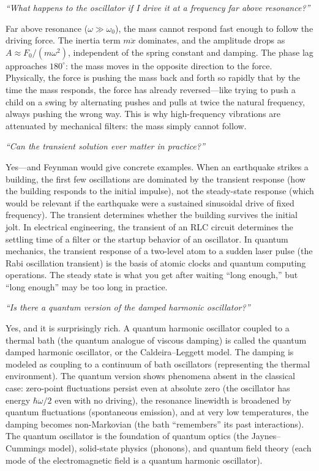 \textit{``What happens to the oscillator if I drive it at a frequency far above resonance?''}

Far above resonance ($\omega \gg \omega_0$), the mass cannot respond fast enough to follow the driving force. The inertia term $m\ddot{x}$ dominates, and the amplitude drops as $A \approx F_0/(m\omega^2)$, independent of the spring constant and damping. The phase lag approaches $180^\circ$: the mass moves in the opposite direction to the force. Physically, the force is pushing the mass back and forth so rapidly that by the time the mass responds, the force has already reversed---like trying to push a child on a swing by alternating pushes and pulls at twice the natural frequency, always pushing the wrong way. This is why high-frequency vibrations are attenuated by mechanical filters: the mass simply cannot follow.

\textit{``Can the transient solution ever matter in practice?''}

Yes---and Feynman would give concrete examples. When an earthquake strikes a building, the first few oscillations are dominated by the transient response (how the building responds to the initial impulse), not the steady-state response (which would be relevant if the earthquake were a sustained sinusoidal drive of fixed frequency). The transient determines whether the building survives the initial jolt. In electrical engineering, the transient of an RLC circuit determines the settling time of a filter or the startup behavior of an oscillator. In quantum mechanics, the transient response of a two-level atom to a sudden laser pulse (the Rabi oscillation transient) is the basis of atomic clocks and quantum computing operations. The steady state is what you get after waiting ``long enough,'' but ``long enough'' may be too long in practice.

\textit{``Is there a quantum version of the damped harmonic oscillator?''}

Yes, and it is surprisingly rich. A quantum harmonic oscillator coupled to a thermal bath (the quantum analogue of viscous damping) is called the quantum damped harmonic oscillator, or the Caldeira--Leggett model. The damping is modeled as coupling to a continuum of bath oscillators (representing the thermal environment). The quantum version shows phenomena absent in the classical case: zero-point fluctuations persist even at absolute zero (the oscillator has energy $\hbar\omega/2$ even with no driving), the resonance linewidth is broadened by quantum fluctuations (spontaneous emission), and at very low temperatures, the damping becomes non-Markovian (the bath ``remembers'' its past interactions). The quantum oscillator is the foundation of quantum optics (the Jaynes--Cummings model), solid-state physics (phonons), and quantum field theory (each mode of the electromagnetic field is a quantum harmonic oscillator).

